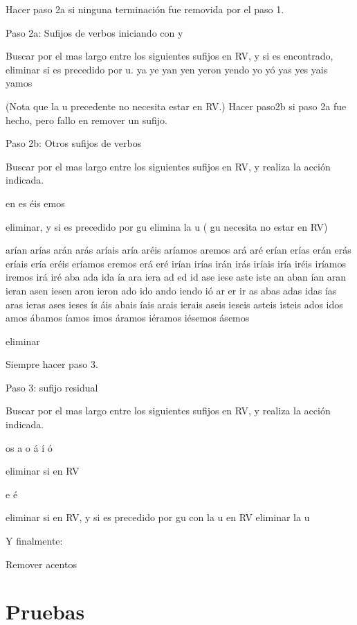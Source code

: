 Hacer paso 2a si ninguna terminación fue removida por el paso 1. 

Paso 2a: Sufijos de verbos iniciando con  y

Buscar por el mas largo entre los siguientes sufijos en RV,  y si es encontrado, eliminar si es precedido por u. 
ya   ye   yan   yen   yeron   yendo   yo   y\'o   yas   yes   yais   yamos

(Nota que la u precedente no necesita estar en  RV.)
Hacer paso2b si paso 2a fue hecho, pero fallo en remover un sufijo. 

Paso 2b: Otros sufijos de verbos

Buscar por el mas largo entre los siguientes sufijos en RV, y realiza la acci\'on indicada. 

en   es   \'eis   emos

eliminar, y si es precedido por gu elimina la u ( gu necesita no estar en RV) 

ar\'ian   ar\'ias   ar\'an   ar\'as   ar\'iais   ar\'ia   ar\'eis   ar\'iamos   aremos   ar\'a   ar\'e   er\'ian   er\'ias   er\'an   er\'as   er\'iais   er\'ia   er\'eis   er\'iamos   eremos   er\'a   er\'e   ir\'ian   ir\'ias   ir\'an   ir\'as   ir\'iais   ir\'ia   ir\'eis   ir\'iamos   iremos   ir\'a   ir\'e   aba   ada   ida   \'ia   ara   iera   ad   ed   id   ase   iese   aste   iste   an   aban   \'ian   aran   ieran   asen   iesen   aron   ieron   ado   ido   ando   iendo   i\'o   ar   er   ir   as   abas   adas   idas   \'ias   aras   ieras   ases   ieses   \'is   \'ais   abais   \'iais   arais   ierais     aseis   ieseis   asteis   isteis   ados   idos   amos   \'abamos   \'iamos   imos   \'aramos   i\'eramos   i\'esemos   \'asemos

eliminar

Siempre hacer paso 3. 

Paso 3: sufijo residual

Buscar por el mas largo entre los siguientes sufijos en RV, y realiza la acción indicada. 

os   a   o   \'a   \'i   \'o

eliminar si en RV 

e   \'e

eliminar si en RV, y si es precedido por gu con la  u en RV eliminar la u

Y finalmente:

Remover acentos

\section{Pruebas}


